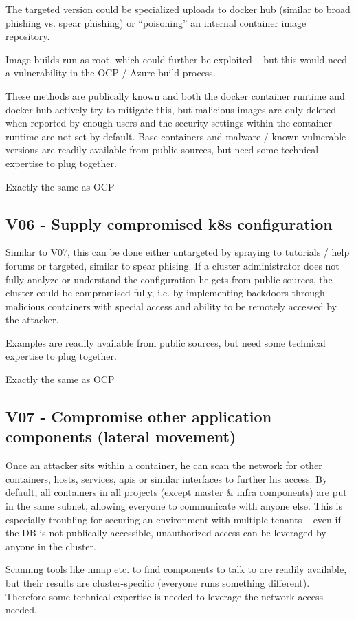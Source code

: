 The targeted version could be specialized uploads to docker hub (similar to broad phishing vs. spear phishing) or “poisoning” an internal container image repository.

Image builds run as root, which could further be exploited – but this would need a vulnerability in the OCP / Azure build process.

These methods are publically known and both the docker container runtime and docker hub actively try to mitigate this, but malicious images are only deleted when reported by enough users and the security settings within the container runtime are not set by default.
Base containers and malware / known vulnerable versions are readily available from public sources, but need some technical expertise to plug together.

Exactly the same as OCP

\subsection{V06 - Supply compromised k8s configuration}
Similar to V07, this can be done either untargeted by spraying to tutorials / help forums or targeted, similar to spear phising.
If a cluster administrator does not fully analyze or understand the configuration he gets from public sources, the cluster could be compromised fully, i.e. by implementing backdoors through malicious containers with special access and ability to be remotely accessed by the attacker.

Examples are readily available from public sources, but need some technical expertise to plug together.

Exactly the same as OCP

\subsection{V07 - Compromise other application components (lateral movement)}
Once an attacker sits within a container, he can scan the network for other containers, hosts, services, apis or similar interfaces to further his access. By default, all containers in all projects (except master \& infra components) are put in the same subnet, allowing everyone to communicate with anyone else.
This is especially troubling for securing an environment with multiple tenants – even if the DB is not publically accessible, unauthorized access can be leveraged by anyone in the cluster.

Scanning tools like nmap etc. to find components to talk to are readily available, but their results are cluster-specific (everyone runs something different). Therefore some technical expertise is needed to leverage the network access needed. 

